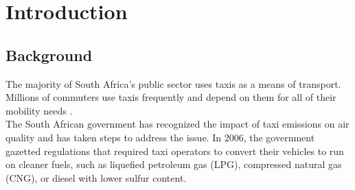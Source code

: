 \graphicspath{{introduction/fig/}}

\chapter{Introduction}
\label{chap:introduction}

\section{Background}
The majority of South Africa's public sector uses taxis as a means of transport. Millions of commuters use taxis frequently and depend on them for all of their mobility needs \cite{depttransport2023}.\\
The South African government has recognized the impact of taxi emissions on air quality and has taken steps to address the issue. In 2006, the government gazetted regulations that required taxi operators to convert their vehicles to run on cleaner fuels, such as liquefied petroleum gas (LPG), compressed natural gas (CNG), or diesel with lower sulfur content\cite{2007Comparison}. 

